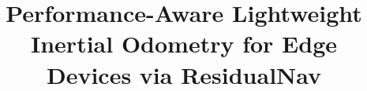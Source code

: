 \documentclass[10pt,conference,letterpaper]{IEEEtran}
\makeatletter
\newcommand{\linebreakand}{%
  \end{@IEEEauthorhalign}
  \hfill\mbox{}\par
  \mbox{}\hfill\begin{@IEEEauthorhalign}
}
\makeatother
\begin{document}

\title{Performance-Aware Lightweight Inertial Odometry for Edge Devices via ResidualNav}


\author{}
\end{document}
